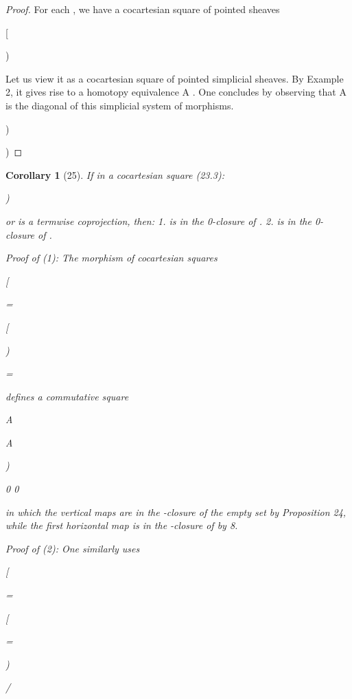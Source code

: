 \documentclass[11pt,a4paper]{article}
\theoremstyle{plain}
\newtheorem{corollary}[theorem]{Corollary}
\theoremstyle{definition}
\begin{document}
\begin{proof} For each , we have a cocartesian square of pointed sheaves

  



[







 )

Let us view it as a cocartesian square of pointed simplicial sheaves. By Example 2,
it gives rise to a homotopy equivalence A
 . One concludes by observing
that A
is the diagonal of this simplicial system of morphisms.


)

)

\end{proof}

\begin{corollary}[25]
If in a cocartesian square (23.3):



   






 )

 or  is a termwise coprojection, then:
1.   is in the 0-closure of  .
2.   is in the 0-closure of  .



Proof of (1): The morphism of cocartesian squares

[






=


 


  



[

 )

=


defines a commutative square

   


A

A

 )

0
0

in which the vertical maps are in the -closure of the empty set by Proposition 24,
while the first horizontal map is in the -closure of by 8.



Proof of (2): One similarly uses

[

=

  
 


[

=

  


 )




/

\end{corollary}
\end{document}
